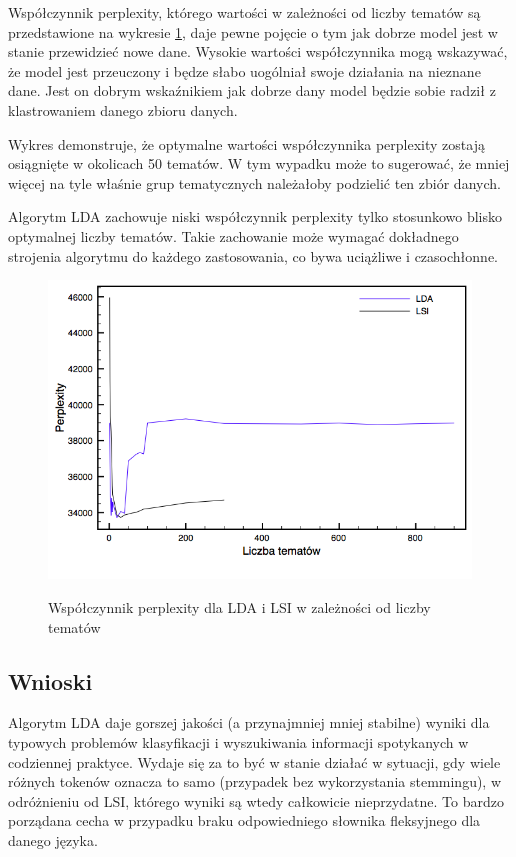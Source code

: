 \documentclass[11pt,a4paper]{article}
\begin{document}
Współczynnik perplexity, którego wartości w zależności od liczby tematów są
przedstawione na wykresie \ref{fig:perplexity}, daje pewne pojęcie o tym jak
dobrze model jest w stanie przewidzieć nowe dane. Wysokie wartości
współczynnika mogą wskazywać, że model jest przeuczony i będze słabo uogólniał
swoje działania na nieznane dane. Jest on dobrym wskaźnikiem jak dobrze dany
model będzie sobie radził z klastrowaniem danego zbioru danych.

Wykres demonstruje, że optymalne wartości współczynnika perplexity zostają
osiągnięte w okolicach 50 tematów. W tym wypadku może to sugerować, że mniej
więcej na tyle właśnie grup tematycznych należałoby podzielić ten zbiór danych.

Algorytm LDA zachowuje niski współczynnik perplexity tylko stosunkowo blisko
optymalnej liczby tematów. Takie zachowanie może wymagać dokładnego strojenia
algorytmu do każdego zastosowania, co bywa uciążliwe i czasochłonne.

\begin{figure}[h]
\caption{Współczynnik perplexity dla LDA i LSI w zależności od liczby tematów}
\includegraphics[width=\linewidth]{gfx/perplexity.png}
\label{fig:perplexity}
\end{figure}

\FloatBarrier

\subsection{Wnioski}

Algorytm LDA daje gorszej jakości (a przynajmniej mniej stabilne) wyniki dla
typowych problemów klasyfikacji i wyszukiwania informacji spotykanych w
codziennej praktyce. Wydaje się za to być w stanie działać w sytuacji, gdy
wiele różnych tokenów oznacza to samo (przypadek bez wykorzystania stemmingu),
w odróżnieniu od LSI, którego wyniki są wtedy całkowicie nieprzydatne. To
bardzo porządana cecha w przypadku braku odpowiedniego słownika fleksyjnego dla
danego języka.
\end{document}
